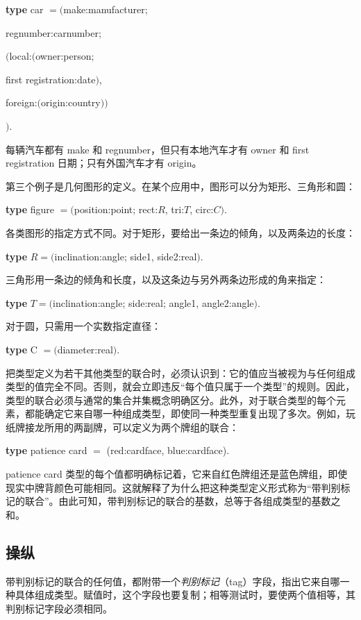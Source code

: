 \quad \textbf{type} car $= ($make:manufacturer;

\tabto{7.5em}regnumber:carnumber;

\tabto{7.5em}$($local:$($owner:person;

\tabto{7.8em}first registration:date$)$,

\tabto{7.8em}foreign:$($origin:country$))$

\tabto{7.1em}$)$.

\noindent
每辆汽车都有 make 和 regnumber，但只有本地汽车才有 owner 和 first registration 日期；只有外国汽车才有 origin。

第三个例子是几何图形的定义。在某个应用中，图形可以分为矩形、三角形和圆：

\quad \textbf{type} figure $= ($position:point; rect:$R$, tri:$T$, circ:$C)$.

\noindent
各类图形的指定方式不同。对于矩形，要给出一条边的倾角，以及两条边的长度：

\quad \textbf{type} $R = ($inclination:angle; side1, side2:real$)$.

\noindent
三角形用一条边的倾角和长度，以及这条边与另外两条边形成的角来指定：

\quad \textbf{type} $T = ($inclination:angle; side:real; angle1, angle2:angle$)$.

\noindent
对于圆，只需用一个实数指定直径：

\quad \textbf{type} C $= ($diameter:real$)$.

把类型定义为若干其他类型的联合时，必须认识到：它的值应当被视为与任何组成类型的值完全不同。否则，就会立即违反“每个值只属于一个类型”的规则。因此，类型的联合必须与通常的集合并集概念明确区分。此外，对于联合类型的每个元素，都能确定它来自哪一种组成类型，即使同一种类型重复出现了多次。例如，玩纸牌接龙所用的两副牌，可以定义为两个牌组的联合：

\quad \textbf{type} patience card $=$ (red:cardface, blue:cardface).

\noindent
patience card 类型的每个值都明确标记着，它来自红色牌组还是蓝色牌组，即使现实中牌背颜色可能相同。这就解释了为什么把这种类型定义形式称为“带判别标记的联合”。由此可知，带判别标记的联合的基数，总等于各组成类型的基数之和。

\subsection{操纵}

带判别标记的联合的任何值，都附带一个\textit{判别标记}（tag）字段，指出它来自哪一种具体组成类型。赋值时，这个字段也要复制；相等测试时，要使两个值相等，其判别标记字段必须相同。

